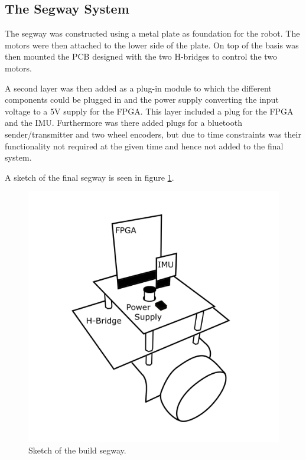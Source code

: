 
\subsection{The Segway System}
The segway was constructed using a metal plate as foundation for the robot.
The motors were then attached to the lower side of the plate.
On top of the basis was then mounted the PCB designed with the two H-bridges to control the two motors.

A second layer was then added as a plug-in module to which the different components could be plugged in and the power supply converting the input voltage to a 5V supply for the FPGA.
This layer included a plug for the FPGA and the IMU.
Furthermore was there added plugs for a bluetooth sender/transmitter and two wheel encoders, but due to time constraints was their functionality not required at the given time and hence not added to the final system.

A sketch of the final segway is seen in figure \ref{fig:segwaysketch}.

\begin{figure}[H]
\centering
\includegraphics[width = 0.5 \textwidth]{images/segway}
\caption{Sketch of the build segway.}
\label{fig:segwaysketch}
\end{figure}